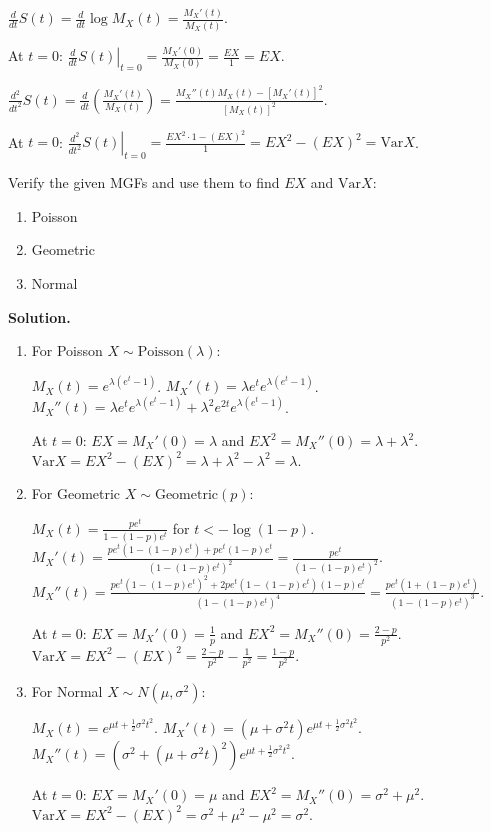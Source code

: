 $\frac{d}{dt}S(t) = \frac{d}{dt}\log M_X(t) = \frac{M_X'(t)}{M_X(t)}$.

At $t=0$: $\left.\frac{d}{dt}S(t)\right|_{t=0} = \frac{M_X'(0)}{M_X(0)} = \frac{EX}{1} = EX$.

$\frac{d^2}{dt^2}S(t) = \frac{d}{dt}\left(\frac{M_X'(t)}{M_X(t)}\right) = \frac{M_X''(t)M_X(t) - [M_X'(t)]^2}{[M_X(t)]^2}$.

At $t=0$: $\left.\frac{d^2}{dt^2}S(t)\right|_{t=0} = \frac{EX^2 \cdot 1 - (EX)^2}{1} = EX^2 - (EX)^2 = \text{Var}X$.

\begin{problembox}
Verify the given MGFs and use them to find $EX$ and $\text{Var}X$:
\begin{enumerate}[label=(\alph*)]
    \item Poisson
    \item Geometric
    \item Normal
\end{enumerate}
\end{problembox}

\noindent\textbf{Solution.}
\begin{enumerate}[label=(\alph*)]
    \item For Poisson $X \sim \text{Poisson}(\lambda)$:
    
    $M_X(t) = e^{\lambda(e^t-1)}$.
    $M_X'(t) = \lambda e^t e^{\lambda(e^t-1)}$.
    $M_X''(t) = \lambda e^t e^{\lambda(e^t-1)} + \lambda^2 e^{2t} e^{\lambda(e^t-1)}$.
    
    At $t=0$: $EX = M_X'(0) = \lambda$ and $EX^2 = M_X''(0) = \lambda + \lambda^2$.
    $\text{Var}X = EX^2 - (EX)^2 = \lambda + \lambda^2 - \lambda^2 = \lambda$.
    
    \item For Geometric $X \sim \text{Geometric}(p)$:
    
    $M_X(t) = \frac{pe^t}{1-(1-p)e^t}$ for $t < -\log(1-p)$.
    $M_X'(t) = \frac{pe^t(1-(1-p)e^t) + pe^t(1-p)e^t}{(1-(1-p)e^t)^2} = \frac{pe^t}{(1-(1-p)e^t)^2}$.
    $M_X''(t) = \frac{pe^t(1-(1-p)e^t)^2 + 2pe^t(1-(1-p)e^t)(1-p)e^t}{(1-(1-p)e^t)^4} = \frac{pe^t(1+(1-p)e^t)}{(1-(1-p)e^t)^3}$.
    
    At $t=0$: $EX = M_X'(0) = \frac{1}{p}$ and $EX^2 = M_X''(0) = \frac{2-p}{p^2}$.
    $\text{Var}X = EX^2 - (EX)^2 = \frac{2-p}{p^2} - \frac{1}{p^2} = \frac{1-p}{p^2}$.
    
    \item For Normal $X \sim N(\mu,\sigma^2)$:
    
    $M_X(t) = e^{\mu t + \frac{1}{2}\sigma^2 t^2}$.
    $M_X'(t) = (\mu + \sigma^2 t)e^{\mu t + \frac{1}{2}\sigma^2 t^2}$.
    $M_X''(t) = (\sigma^2 + (\mu + \sigma^2 t)^2)e^{\mu t + \frac{1}{2}\sigma^2 t^2}$.
    
    At $t=0$: $EX = M_X'(0) = \mu$ and $EX^2 = M_X''(0) = \sigma^2 + \mu^2$.
    $\text{Var}X = EX^2 - (EX)^2 = \sigma^2 + \mu^2 - \mu^2 = \sigma^2$.
\end{enumerate}

